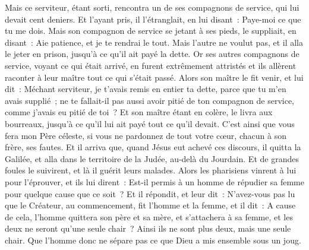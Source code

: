 \begin{multicols}{2}
Mais ce serviteur, étant sorti, rencontra un de ses compagnons de service, qui lui devait cent deniers. Et l'ayant pris, il l'étranglait, en lui disant~: Paye-moi ce que tu me dois.
Mais son compagnon de service se jetant à ses pieds, le suppliait, en disant~: Aie patience, et je te rendrai le tout.
Mais l'autre ne voulut pas, et il alla le jeter en prison, jusqu'à ce qu'il ait payé la dette.
Or ses autres compagnons de service, voyant ce qui était arrivé, en furent extrêmement attristés et ils allèrent raconter à leur maître tout ce qui s'était passé.
Alors son maître le fit venir, et lui dit~: Méchant serviteur, je t'avais remis en entier ta dette, parce que tu m'en avais supplié~;
ne te fallait-il pas aussi avoir pitié de ton compagnon de service, comme j'avais eu pitié de toi~?
Et son maître étant en colère, le livra aux bourreaux, jusqu'à ce qu'il lui ait payé tout ce qu'il devait.
C'est ainsi que vous fera mon Père céleste, si vous ne pardonnez de tout votre cœur, chacun à son frère, ses fautes.
\VerseOne{}Et il arriva que, quand Jésus eut achevé ces discours, il quitta la Galilée, et alla dans le territoire de la Judée, au-delà du Jourdain.
Et de grandes foules le suivirent, et là il guérit leurs malades.
Alors les pharisiens vinrent à lui pour l'éprouver, et ils lui dirent~: Est-il permis à un homme de répudier sa femme pour quelque cause que ce soit~?
Et il répondit, et leur dit~: N'avez-vous pas lu que le Créateur, au commencement, fit l'homme et la femme,
et il dit~: A cause de cela, l'homme quittera son père et sa mère, et s'attachera à sa femme, et les deux ne seront qu'une seule chair~?
Ainsi ils ne sont plus deux, mais une seule chair. Que l'homme donc ne sépare pas ce que Dieu a mis ensemble sous un joug.

\end{multicols}

